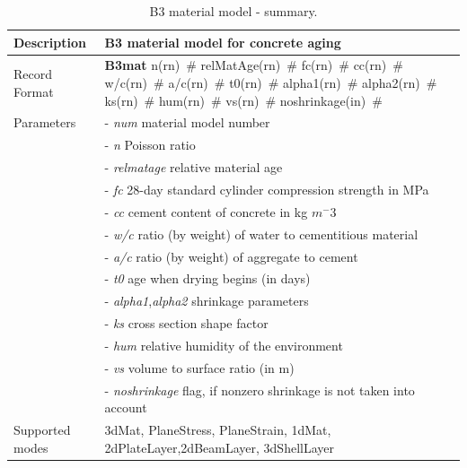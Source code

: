 \documentclass[epsf,a4paper]{article}
\newcommand{\descitem}[1]{{\noindent \bf #1}}
\newcommand{\elemparam}[2]{{{#1\tiny (#2)}~\#}}
\newcommand{\param}[1]{{\it #1}}
\begin{document}
\begin{table}[h]                                                                
\begin{tabular}{|l|p{9cm}|}                                                      
\hline                                                                          
Description & B3 material model  for concrete aging\\
\hline                                                                          
Record Format & \descitem{B3mat}  \elemparam{n}{rn}
\elemparam{relMatAge}{rn} \elemparam{fc}{rn} \elemparam{cc}{rn} \elemparam{w/c}{rn}
\elemparam{a/c}{rn} \elemparam{t0}{rn} 
\elemparam{alpha1}{rn} \elemparam{alpha2}{rn} \elemparam{ks}{rn} 
\elemparam{hum}{rn} \elemparam{vs}{rn} \elemparam{noshrinkage}{in}\\ 
Parameters &- \param{num} material model number\\
&- \param{n} Poisson ratio\\
&- \param{relmatage} relative material age \\
&- \param{fc} 28-day standard cylinder compression strength in MPa\\
&- \param{cc} cement content of concrete  in kg $m^-3$ \\
&- \param{w/c} ratio (by weight) of water to cementitious material  \\
&- \param{a/c} ratio (by weight) of aggregate to cement \\
&- \param{t0} age when drying begins (in days)\\
&- \param{alpha1},\param{alpha2} shrinkage parameters\\
&- \param{ks} cross section shape factor \\
&- \param{hum} relative humidity of the environment\\
&- \param{vs} volume to surface ratio (in m)\\
&- \param{noshrinkage} flag, if nonzero shrinkage is not taken into account\\
Supported modes& 3dMat, PlaneStress, PlaneStrain, 1dMat,
2dPlateLayer,2dBeamLayer, 3dShellLayer\\
\hline
\end{tabular}                                                                   
\caption{B3 material model - summary.}                
\label{b3_table}                                                         
\end{table}                                                                     
\end{document}
